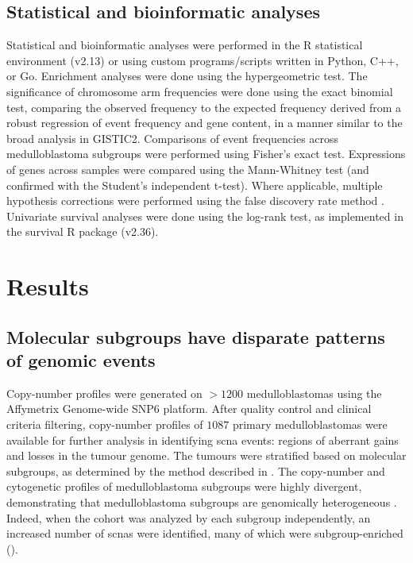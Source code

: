 \subsection{Statistical and bioinformatic analyses}

Statistical and bioinformatic analyses were performed in the R statistical environment (v2.13) or using custom programs/scripts written in Python, C++, or Go. Enrichment analyses were done using the hypergeometric test. The significance of chromosome arm frequencies were done using the exact binomial test, comparing the observed frequency to the expected frequency derived from a robust regression of event frequency and gene content, in a manner similar to the broad analysis in GISTIC2. Comparisons of event frequencies across medulloblastoma subgroups were performed using Fisher's exact test. Expressions of genes across samples were compared using the Mann-Whitney test (and confirmed with the Student's independent t-test). Where applicable, multiple hypothesis corrections were performed using the false discovery rate method . Univariate survival analyses were done using the log-rank test, as implemented in the survival R package (v2.36).

\clearpage

\section{Results}

\subsection{Molecular subgroups have disparate patterns of genomic events}

Copy-number profiles were generated on $> 1200$ medulloblastomas using the Affymetrix Genome-wide SNP6 platform. After quality control and clinical criteria filtering, copy-number profiles of $1087$ primary medulloblastomas were available for further analysis in identifying \gls{scna} events: regions of aberrant gains and losses in the tumour genome. The tumours were stratified based on molecular subgroups, as determined by the method described in . The copy-number and cytogenetic profiles of medulloblastoma subgroups were highly divergent, demonstrating that medulloblastoma subgroups are genomically heterogeneous . Indeed, when the cohort was analyzed by each subgroup independently, an increased number of \gls{scnas} were identified, many of which were subgroup-enriched ().

